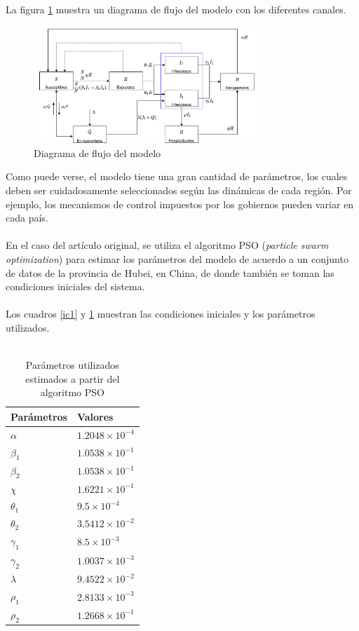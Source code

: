 \documentclass[conference]{IEEEtran}
\begin{document}
La figura \ref{block_diagram} muestra un diagrama de flujo del modelo con los diferentes canales.

\begin{figure}[H]
    \centering
    \includegraphics[width=8.5cm]{../Figures/Model_flowchart.pdf}
    \caption{Diagrama de flujo del modelo}
    \label{block_diagram}
\end{figure}


Como puede verse, el modelo tiene una gran cantidad de parámetros, los cuales deben
ser cuidadosamente seleccionados según las dinámicas de cada región. Por ejemplo, los 
mecanismos de control impuestos por los gobiernos pueden variar en cada país.
\\\\
En el caso del artículo original, se utiliza el algoritmo PSO (\textit{particle swarm optimization})
para estimar los parámetros del modelo de acuerdo a un conjunto de datos de la provincia
de Hubei, en China, de donde también se toman las condiciones iniciales del sistema.
\\\\
Los cuadros \ref{ic1} y \ref{p1} muestran las condiciones iniciales y los parámetros
utilizados.
\\\\
\begin{table}[h]
    \centering
    \begin{tabular}{ll}
    \hline
    Parámetros  & Valores                 \\ \hline
    $\alpha$    & $1.2048 \times 10^{-4}$ \\ 
    $\beta_1$   & $1.0538 \times 10^{-1}$ \\ 
    $\beta_2$   & $1.0538 \times 10^{-1}$ \\ 
    $\chi$      & $1.6221 \times 10^{-1}$ \\ 
    $\theta_1 $ & $9.5 \times 10^{-4}$    \\ 
    $\theta_2$  & $3.5412 \times 10^{-2}$ \\ 
    $\gamma_1$  & $8.5 \times 10^{-3}$    \\ 
    $\gamma_2$  & $1.0037 \times 10^{-3}$ \\ 
    $\lambda$   & $9.4522 \times 10^{-2}$ \\ 
    $\rho_1 $   & $2.8133 \times 10^{-3}$ \\ 
    $\rho_2$    & $1.2668 \times 10^{-1}$ \\ \hline
    \end{tabular}
    \caption{Parámetros utilizados estimados a partir del algoritmo PSO}
    \label{p1}
\end{table}
\end{document}
